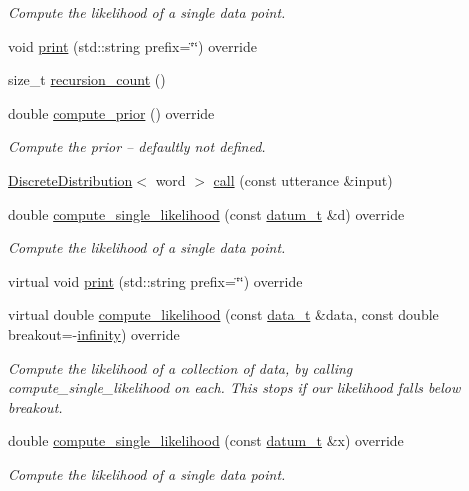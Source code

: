 \begin{DoxyCompactItemize}
\begin{DoxyCompactList}\small\item\em Compute the likelihood of a single data point. \end{DoxyCompactList}\item 
void \hyperlink{class_my_hypothesis_a91fd22a2724e04c0e7c67ea4282beac4}{print} (std\+::string prefix=\char`\"{}\char`\"{}) override
\item 
size\+\_\+t \hyperlink{class_my_hypothesis_a536a607a2008f50fb1062fd540c60063}{recursion\+\_\+count} ()
\item 
double \hyperlink{class_my_hypothesis_a67477313b60b21158bbfaad35dc5d275}{compute\+\_\+prior} () override
\begin{DoxyCompactList}\small\item\em Compute the prior -- defaultly not defined. \end{DoxyCompactList}\item 
\hyperlink{class_discrete_distribution}{Discrete\+Distribution}$<$ word $>$ \hyperlink{class_my_hypothesis_a88c6c3c093e040601d7283abf09b6348}{call} (const utterance \&input)
\item 
double \hyperlink{class_my_hypothesis_a480fc9e50d0faa0f5226f56187fd2eec}{compute\+\_\+single\+\_\+likelihood} (const \hyperlink{class_bayesable_a9f1a6c0cd7855550fa10b1a8f13a5867}{datum\+\_\+t} \&d) override
\begin{DoxyCompactList}\small\item\em Compute the likelihood of a single data point. \end{DoxyCompactList}\item 
virtual void \hyperlink{class_my_hypothesis_a81fa991ffd2cabe6f71ec129ae26ca6c}{print} (std\+::string prefix=\char`\"{}\char`\"{}) override
\item 
virtual double \hyperlink{class_my_hypothesis_ad5cd40d67c9b6fb61311a5f4a08df426}{compute\+\_\+likelihood} (const \hyperlink{class_bayesable_aa2788c4d7718c0a824e1d28c4c98f921}{data\+\_\+t} \&data, const double breakout=-\/\hyperlink{_numerics_8h_a1bb1e42ae1b40cad6e99da0aab8a5576}{infinity}) override
\begin{DoxyCompactList}\small\item\em Compute the likelihood of a collection of data, by calling compute\+\_\+single\+\_\+likelihood on each. This stops if our likelihood falls below breakout. \end{DoxyCompactList}\item 
double \hyperlink{class_my_hypothesis_af23a45a03a28ea4f42438e70d47acacb}{compute\+\_\+single\+\_\+likelihood} (const \hyperlink{class_bayesable_a9f1a6c0cd7855550fa10b1a8f13a5867}{datum\+\_\+t} \&x) override
\begin{DoxyCompactList}\small\item\em Compute the likelihood of a single data point. \end{DoxyCompactList}\end{DoxyCompactItemize}
